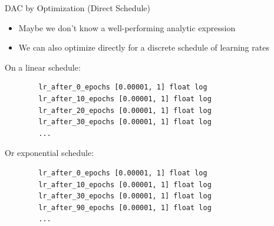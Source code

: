 \begin{frame}[c,fragile]{DAC by Optimization (Direct Schedule)}
	
	
	\begin{itemize}
	    \item Maybe we don't know a well-performing analytic expression
	    \item We can also optimize directly for a discrete schedule of learning rates
	\end{itemize}
	
	On a linear schedule:
	\begin{verbatim}
	    lr_after_0_epochs [0.00001, 1] float log
	    lr_after_10_epochs [0.00001, 1] float log
	    lr_after_20_epochs [0.00001, 1] float log
	    lr_after_30_epochs [0.00001, 1] float log
	    ...
	\end{verbatim}
	
	Or exponential schedule:
	\begin{verbatim}
	    lr_after_0_epochs [0.00001, 1] float log
	    lr_after_10_epochs [0.00001, 1] float log
	    lr_after_30_epochs [0.00001, 1] float log
	    lr_after_90_epochs [0.00001, 1] float log
	    ...
	\end{verbatim}
	
\end{frame}
